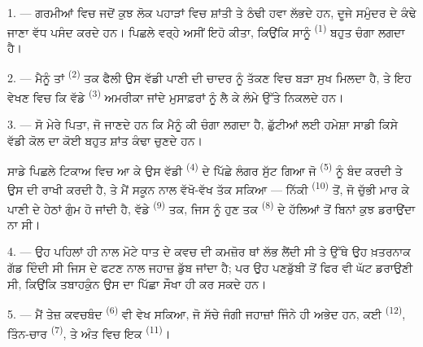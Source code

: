 %

\VUsaut{4.0mm}
\VUsaut{3.0mm}
\VUsaut{3.0mm}

1. --- ਗਰਮੀਆਂ ਵਿਚ ਜਦੋਂ ਕੁਝ ਲੋਕ ਪਹਾੜਾਂ ਵਿਚ ਸ਼ਾਂਤੀ ਤੇ ਠੰਢੀ ਹਵਾ ਲੱਭਦੇ ਹਨ, ਦੂਜੇ
ਸਮੁੰਦਰ ਦੇ ਕੰਢੇ ਜਾਣਾ ਵੱਧ ਪਸੰਦ ਕਰਦੇ ਹਨ। ਪਿਛਲੇ ਵਰ੍ਹੇ ਅਸੀਂ ਇਹੋ ਕੀਤਾ, ਕਿਉਂਕਿ ਸਾਨੂੰ
 \textsuperscript{(1)} ਬਹੁਤ ਚੰਗਾ ਲਗਦਾ ਹੈ।

2. --- ਮੈਨੂੰ ਤਾਂ  \textsuperscript{(2)} ਤਕ ਫੈਲੀ ਉਸ ਵੱਡੀ ਪਾਣੀ ਦੀ
ਚਾਦਰ ਨੂੰ ਤੱਕਣ ਵਿਚ ਬੜਾ ਸੁਖ ਮਿਲਦਾ ਹੈ, ਤੇ ਇਹ ਵੇਖਣ ਵਿਚ ਕਿ ਵੱਡੇ 
\textsuperscript{(3)} ਅਮਰੀਕਾ ਜਾਂਦੇ ਮੁਸਾਫ਼ਰਾਂ ਨੂੰ ਲੈ ਕੇ ਲੰਮੇ 
ਉੱਤੇ ਨਿਕਲਦੇ ਹਨ।

3. --- ਸੋ ਮੇਰੇ ਪਿਤਾ, ਜੋ ਜਾਣਦੇ ਹਨ ਕਿ ਮੈਨੂੰ ਕੀ ਚੰਗਾ ਲਗਦਾ ਹੈ, ਛੁੱਟੀਆਂ ਲਈ ਹਮੇਸ਼ਾ
ਸਾਡੀ ਕਿਸੇ ਵੱਡੀ  ਕੋਲ ਦਾ ਕੋਈ ਬਹੁਤ ਸ਼ਾਂਤ ਕੰਢਾ ਚੁਣਦੇ ਹਨ।

ਸਾਡੇ ਪਿਛਲੇ ਟਿਕਾਅ ਵਿਚ  ਆ ਕੇ ਉਸ ਵੱਡੀ 
\textsuperscript{(4)} ਦੇ ਪਿੱਛੇ ਲੰਗਰ ਸੁੱਟ ਗਿਆ ਜੋ 
\textsuperscript{(5)} ਨੂੰ ਬੰਦ ਕਰਦੀ ਤੇ ਉਸ ਦੀ ਰਾਖੀ ਕਰਦੀ ਹੈ, ਤੇ ਮੈਂ ਸਕੂਨ ਨਾਲ ਵੱਖੋ-ਵੱਖ
 ਤੱਕ ਸਕਿਆ — ਨਿੱਕੀ  \textsuperscript{(10)}
ਤੋਂ, ਜੋ ਚੁੱਭੀ ਮਾਰ ਕੇ ਪਾਣੀ ਦੇ ਹੇਠਾਂ ਗੁੰਮ ਹੋ ਜਾਂਦੀ ਹੈ, ਵੱਡੇ 
\textsuperscript{(9)} ਤਕ, ਜਿਸ ਨੂੰ ਹੁਣ ਤਕ 
\textsuperscript{(8)} ਦੇ ਹੱਲਿਆਂ ਤੋਂ ਬਿਨਾਂ ਕੁਝ ਡਰਾਉਂਦਾ ਨਾ ਸੀ।

\VUsaut{3.0mm}
\VUsaut{3.0mm}

4. --- ਉਹ ਪਹਿਲਾਂ ਹੀ  ਨਾਲ ਮੋਟੇ ਧਾਤ ਦੇ ਕਵਚ ਦੀ ਕਮਜ਼ੋਰ ਥਾਂ ਲੱਭ ਲੈਂਦੀ
ਸੀ ਤੇ ਉੱਥੇ ਉਹ ਖ਼ਤਰਨਾਕ  ਗੱਡ ਦਿੰਦੀ ਸੀ ਜਿਸ ਦੇ ਫਟਣ ਨਾਲ ਜਹਾਜ਼ ਡੁੱਬ
ਜਾਂਦਾ ਹੈ; ਪਰ ਉਹ ਪਣਡੁੱਬੀ ਤੋਂ ਫਿਰ ਵੀ ਘੱਟ ਡਰਾਉਣੀ ਸੀ, ਕਿਉਂਕਿ ਤਬਾਹਕੁੰਨ ਉਸ ਦਾ ਪਿੱਛਾ
ਸੌਖਾ ਹੀ ਕਰ ਸਕਦੇ ਹਨ।

5. --- ਮੈਂ ਤੇਜ਼ ਕਵਚਬੰਦ  \textsuperscript{(6)} ਵੀ ਵੇਖ ਸਕਿਆ, ਜੋ ਸੱਚੇ
ਜੰਗੀ ਜਹਾਜ਼ਾਂ ਜਿੰਨੇ ਹੀ ਅਭੇਦ ਹਨ, ਕਈ  \textsuperscript{(12)},
ਤਿੰਨ-ਚਾਰ  \textsuperscript{(7)}, ਤੇ ਅੰਤ ਵਿਚ ਇਕ
 \textsuperscript{(11)}।

